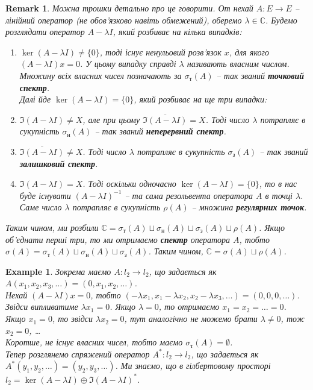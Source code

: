 \documentclass[a4paper, 10pt]{article}
\theoremstyle{theoremdd}
\theoremstyle{theoremdd}
\theoremstyle{theoremdd}
\theoremstyle{theoremdd}
\newtheorem{example}[theorem]{Example}
\theoremstyle{theoremdd}
\theoremstyle{theoremdd}
\newtheorem{remark}[theorem]{Remark}
\theoremstyle{theoremdd}
\theoremstyle{theoremdd}
\begin{document}
\begin{remark}
Можна трошки детально про це говорити. От нехай $A \colon E \to E$ -- лінійний оператор (не обов'язково навіть обмежений), оберемо $\lambda \in \mathbb{C}$. Будемо розглядати оператор $A - \lambda I$, який розбиває на кілька випадків:
\begin{enumerate}[wide=0pt,label={\arabic*)}]
\item $\ker (A-\lambda I) \neq \{0\}$, тоді існує ненульовий розв'язок $x$, для якого $(A-\lambda I)x = 0$. У цьому випадку справді $\lambda$ називають власним числом. Множину всіх власних чисел позначають за $\sigma_{\text{т}}(A)$ -- так званий \textbf{точковий спектр}.
\bigskip \\
Далі йде $\ker(A-\lambda I) = \{0\}$, який розбиває на ще три випадки:
\item $\Im(A-\lambda I) \neq X$, але при цьому $\overline{\Im(A-\lambda I)} = X$. Тоді число $\lambda$ потрапляє в сукупність $\sigma_{\text{н}}(A)$ -- так званий \textbf{неперервний спектр}.
\item $\overline{\Im(A-\lambda I)} \neq X$. Тоді число $\lambda$ потрапляє в сукупність $\sigma_{\text{з}}(A)$ -- так званий \textbf{залишковий спектр}.
\item $\Im(A-\lambda I) = X$. Тоді оскільки одночасно $\ker(A-\lambda I) = \{0\}$, то в нас буде існувати $(A-\lambda I)^{-1}$ -- та сама резольвента оператора $A$ в точці $\lambda$. Саме число $\lambda$ потрапляє в сукупність $\rho(A)$ -- множина \textbf{регулярних точок}.
\end{enumerate}
Таким чином, ми розбили $\mathbb{C} = \sigma_{\text{т}}(A) \sqcup \sigma_{\text{н}}(A) \sqcup \sigma_{\text{з}}(A) \sqcup \rho(A)$. Якщо об'єднати перші три, то ми отримаємо \textbf{спектр} оператора $A$, тобто $\sigma(A) = \sigma_{\text{т}}(A) \sqcup \sigma_{\text{н}}(A) \sqcup \sigma_{\text{з}}(A)$. Таким чином, $\mathbb{C} = \sigma(A) \sqcup \rho(A)$.
\end{remark}

\begin{example}
Зокрема маємо $A \colon l_2 \to l_2$, що задається як $A(x_1,x_2,x_3,\dots) = (0,x_1,x_2,\dots)$.\\
Нехай $(A-\lambda I)x = 0$, тобто $(-\lambda x_1, x_1 - \lambda x_2, x_2 - \lambda x_3, \dots) = (0,0,0,\dots)$. Звідси випливатиме $\lambda x_1 = 0$. Якщо $\lambda = 0$, то отримаємо $x_1 = x_2 = \dots = 0$. Якщо $x_1 = 0$, то звідси $\lambda x_2 = 0$, тут аналогічно не можемо брати $\lambda \neq 0$, тож $x_2 = 0$, \dots\\
Коротше, не існує власних чисел, тобто маємо $\sigma_{\text{т}}(A) = \emptyset$.\\
Тепер розглянемо спряжений оператор $A^* \colon l_2 \to l_2$, що задається як $A^*(y_1,y_2,\dots) = (y_2,y_3,\dots)$. Ми знаємо, що в гілбертовому просторі $l_2 = \ker (A-\lambda I) \oplus \Im(A-\lambda I)^*$.
\end{example}
\end{document}

